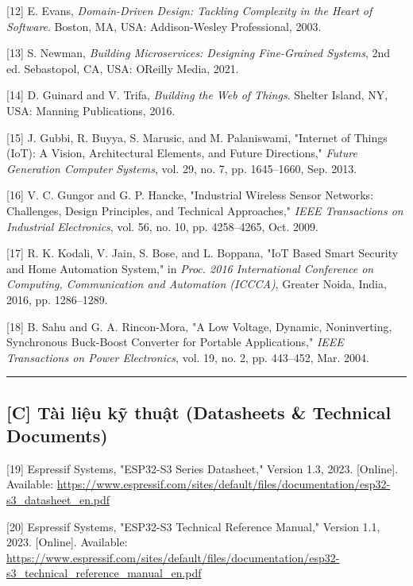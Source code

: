 \documentclass[a4paper]{extarticle}
\begin{document}
{[}12{]} E. Evans, \emph{Domain-Driven Design: Tackling Complexity in
the Heart of Software}. Boston, MA, USA: Addison-Wesley Professional,
2003.

{[}13{]} S. Newman, \emph{Building Microservices: Designing Fine-Grained
Systems}, 2nd ed. Sebastopol, CA, USA: O\textquotesingle Reilly Media,
2021.

{[}14{]} D. Guinard and V. Trifa, \emph{Building the Web of Things}.
Shelter Island, NY, USA: Manning Publications, 2016.

{[}15{]} J. Gubbi, R. Buyya, S. Marusic, and M. Palaniswami, "Internet
of Things (IoT): A Vision, Architectural Elements, and Future
Directions," \emph{Future Generation Computer Systems}, vol. 29, no. 7,
pp. 1645--1660, Sep. 2013.

{[}16{]} V. C. Gungor and G. P. Hancke, "Industrial Wireless Sensor
Networks: Challenges, Design Principles, and Technical Approaches,"
\emph{IEEE Transactions on Industrial Electronics}, vol. 56, no. 10, pp.
4258--4265, Oct. 2009.

{[}17{]} R. K. Kodali, V. Jain, S. Bose, and L. Boppana, "IoT Based
Smart Security and Home Automation System," in \emph{Proc. 2016
International Conference on Computing, Communication and Automation
(ICCCA)}, Greater Noida, India, 2016, pp. 1286--1289.

{[}18{]} B. Sahu and G. A. Rincon-Mora, "A Low Voltage, Dynamic,
Noninverting, Synchronous Buck-Boost Converter for Portable
Applications," \emph{IEEE Transactions on Power Electronics}, vol. 19,
no. 2, pp. 443--452, Mar. 2004.

\begin{center}\rule{0.5\linewidth}{0.5pt}\end{center}

\subsection{{[}C{]} Tài liệu kỹ thuật (Datasheets \& Technical
Documents)}\label{c-tuxe0i-liux1ec7u-kux1ef9-thuux1eadt-datasheets--technical-documents}

{[}19{]} Espressif Systems, "ESP32-S3 Series Datasheet," Version 1.3,
2023. {[}Online{]}. Available:
\url{https://www.espressif.com/sites/default/files/documentation/esp32-s3_datasheet_en.pdf}

{[}20{]} Espressif Systems, "ESP32-S3 Technical Reference Manual,"
Version 1.1, 2023. {[}Online{]}. Available:
\url{https://www.espressif.com/sites/default/files/documentation/esp32-s3_technical_reference_manual_en.pdf}
\end{document}
